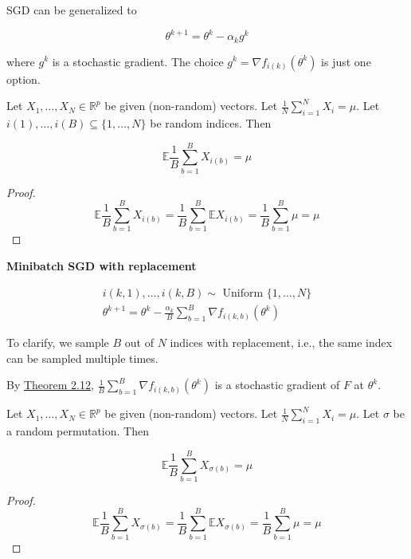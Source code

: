 SGD can be generalized to

$$
\theta^{k+1}=\theta^{k}-\alpha_{k} g^{k}
$$

where $g^{k}$ is a stochastic gradient. The choice $g^{k}=\nabla f_{i(k)}\left(\theta^{k}\right)$ is just one option.

\begin{theorem}
    Let $X_{1}, \ldots, X_{N} \in \mathbb{R}^{p}$ be given (non-random) vectors. Let $\frac{1}{N} \sum_{i=1}^{N} X_{i}=\mu$. Let $i(1), \ldots, i(B) \subseteq\{1, \ldots, N\}$ be random indices. Then

    $$
    \mathbb{E} \frac{1}{B} \sum_{b=1}^{B} X_{i(b)}=\mu
    $$

    \begin{proof}
        $$
        \mathbb{E} \frac{1}{B} \sum_{b=1}^{B} X_{i(b)}=\frac{1}{B} \sum_{b=1}^{B} \mathbb{E} X_{i(b)}=\frac{1}{B} \sum_{b=1}^{B} \mu=\mu
        $$
    \end{proof}
\end{theorem}

\begin{definition}
    \textbf{Minibatch SGD with replacement}

    $$
    \begin{gathered}
    i(k, 1), \ldots, i(k, B) \sim \text { Uniform }\{1, \ldots, N\} \\
    \theta^{k+1}=\theta^{k}-\frac{\alpha_{k}}{B} \sum_{b=1}^{B} \nabla f_{i(k, b)}\left(\theta^{k}\right)
    \end{gathered}
    $$

    To clarify, we sample $B$ out of $N$ indices with replacement, i.e., the same index can be sampled multiple times.

    By \hyperref[theorem:2.12]{Theorem 2.12}, $\frac{1}{B} \sum_{b=1}^{B} \nabla f_{i(k, b)}\left(\theta^{k}\right)$ is a stochastic gradient of $F$ at $\theta^{k}$.
\end{definition}

\begin{theorem}
    Let $X_{1}, \ldots, X_{N} \in \mathbb{R}^{p}$ be given (non-random) vectors. Let $\frac{1}{N} \sum_{i=1}^{N} X_{i}=\mu$. Let $\sigma$ be a random permutation. Then

    $$
    \mathbb{E} \frac{1}{B} \sum_{b=1}^{B} X_{\sigma(b)}=\mu
    $$

    \begin{proof}
        $$
        \mathbb{E} \frac{1}{B} \sum_{b=1}^{B} X_{\sigma(b)}=\frac{1}{B} \sum_{b=1}^{B} \mathbb{E} X_{\sigma(b)}=\frac{1}{B} \sum_{b=1}^{B} \mu=\mu
        $$
    \end{proof}
\end{theorem}

